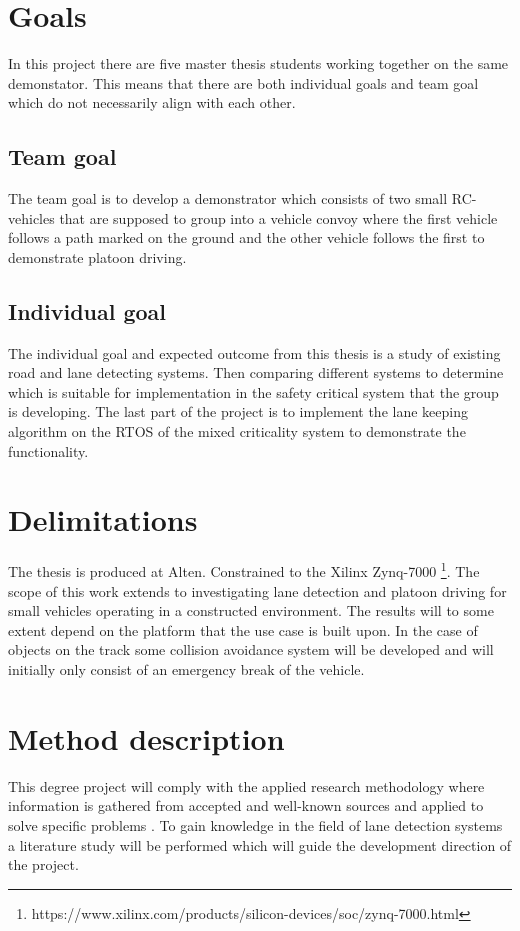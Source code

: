 \section{Goals}
In this project there are five master thesis students working together on the same demonstator. This means that there are both individual goals and team goal which do not necessarily align with each other.

\subsection{Team goal}
The team goal is to develop a demonstrator which consists of two small RC-vehicles that are supposed to group into a vehicle convoy where the first vehicle follows a path marked on the ground and the other vehicle follows the first to demonstrate platoon driving.

\subsection{Individual goal}
The individual goal and expected outcome from this thesis is a study of existing road and lane detecting systems. Then comparing different systems to determine which is suitable for implementation in the safety critical system that the group is developing. The last part of the project is to implement the lane keeping algorithm on the RTOS of the mixed criticality system to demonstrate the functionality.

\section{Delimitations}
The thesis is produced at Alten. Constrained to the Xilinx Zynq-7000 \footnote{https://www.xilinx.com/products/silicon-devices/soc/zynq-7000.html}. The scope of this work extends to investigating lane detection and platoon driving for small vehicles operating in a constructed environment. The results will to some extent depend on the platform that the use case is built upon. In the case of objects on the track some collision avoidance system will be developed and will initially only consist of an emergency break of the vehicle.

\section{Method description}
This degree project will comply with the applied research methodology where information is gathered from accepted and well-known sources and applied to solve specific problems \cite{haakansson2013portal}. To gain knowledge in the field of lane detection systems a literature study will be performed which will guide the development direction of the project.\\

